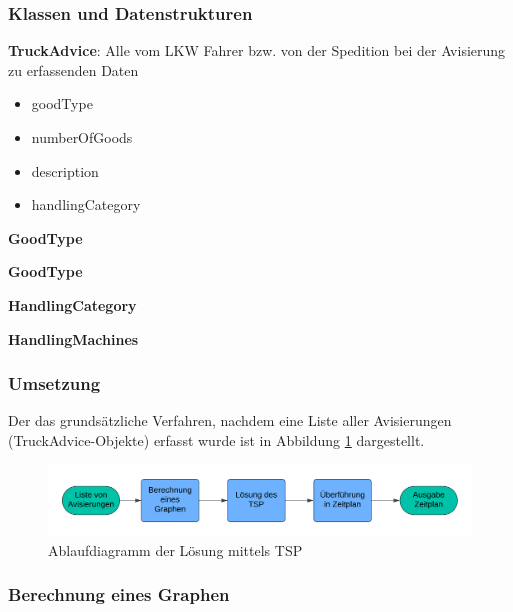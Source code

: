\subsubsection{Klassen und Datenstrukturen}

\textbf{TruckAdvice}: Alle vom LKW Fahrer bzw. von der Spedition bei der Avisierung zu erfassenden Daten
\begin{itemize}
  \item goodType
  \item numberOfGoods
  \item description
  \item handlingCategory
\end{itemize}

\textbf{GoodType}

\textbf{GoodType}

\textbf{HandlingCategory}

\textbf{HandlingMachines}


\subsubsection{Umsetzung}

Der das grundsätzliche Verfahren, nachdem eine Liste aller Avisierungen (TruckAdvice-Objekte) erfasst wurde ist in Abbildung \ref{fig:flowchart_tsp_algorithm} dargestellt.

\begin{figure}[H]
    \centering
    \includegraphics[width=\textwidth]{images/Flowchart TSP Algorithm.png}
    \caption{Ablaufdiagramm der Lösung mittels TSP}
    \label{fig:flowchart_tsp_algorithm}
\end{figure}

\subsubsection{Berechnung eines Graphen}

